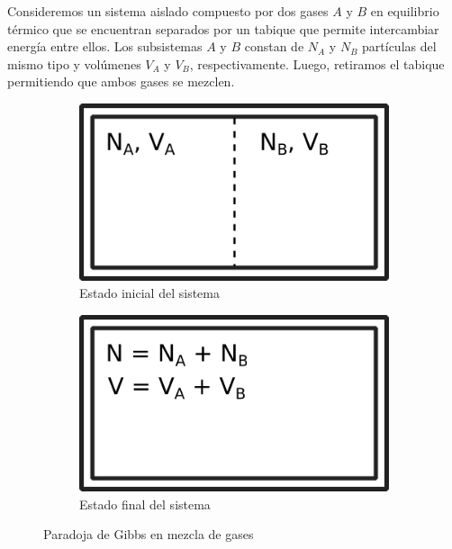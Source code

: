 \documentclass[a4paper,11pt]{article}
\begin{document}
Consideremos un sistema aislado compuesto por dos gases $A$ y $B$ en
equilibrio térmico que se encuentran separados por un tabique que
permite intercambiar energía entre ellos.
Los subsistemas $A$ y $B$ constan de $N_A$ y $N_B$ partículas del mismo
tipo y volúmenes $V_A$ y $V_B$, respectivamente.
Luego, retiramos el tabique permitiendo que ambos gases se mezclen.

\begin{figure}[h!]
    \centering
    \begin{subfigure}[b]{0.3\textwidth}
        \includegraphics[width=\textwidth]{figs/paradoja-gibbs-1.png}
        \caption{Estado inicial del sistema}
        \label{fig:gibbs-tabique}
    \end{subfigure}
    \hspace{0.1\textwidth}
    \begin{subfigure}[b]{0.3\textwidth}
        \includegraphics[width=\textwidth]{figs/paradoja-gibbs-2.png}
        \caption{Estado final del sistema}
        \label{fig:gibbs-mezcla}
    \end{subfigure}
    \caption{Paradoja de Gibbs en mezcla de gases}
\end{figure}
\end{document}
